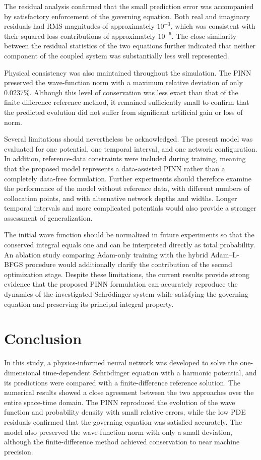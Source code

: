 \documentclass[11pt]{article}
\begin{document}
The residual analysis confirmed that the small prediction error was 
accompanied by satisfactory enforcement of the governing equation. Both real and imaginary residuals 
had RMS magnitudes of approximately \(10^{-3}\), which was consistent with their squared 
loss contributions of approximately \(10^{-6}\). The close similarity between the residual 
statistics of the two equations further indicated that neither component of the coupled 
system was substantially less well represented.

Physical consistency was also maintained throughout the simulation. The PINN preserved the 
wave-function norm with a maximum relative deviation of only \(0.0237\%\). Although this 
level of conservation was less exact than that of the finite-difference reference method, 
it remained sufficiently small to confirm that the predicted evolution did not suffer from 
significant artificial gain or loss of norm.

Several limitations should nevertheless be acknowledged. The present model was evaluated 
for one potential, one temporal interval, and one network configuration. In addition, reference-data 
constraints were included during training, meaning that the proposed model represents a 
data-assisted PINN rather than a completely data-free formulation. Further experiments should 
therefore examine the performance of the model without reference data, with different numbers of 
collocation points, and with alternative network depths and widths. Longer temporal intervals 
and more complicated potentials would also provide a stronger assessment of generalization.

The initial wave function should be normalized in future experiments so that the conserved 
integral equals one and can be interpreted directly as total probability. An ablation study 
comparing Adam-only training with the hybrid Adam--L-BFGS procedure would additionally clarify 
the contribution of the second optimization stage. Despite these limitations, the current 
results provide strong evidence that the proposed PINN formulation can accurately reproduce 
the dynamics of the investigated Schrödinger system while satisfying the governing equation
and preserving its principal integral property.



\section{Conclusion}

In this study, a physics-informed neural network was developed to solve the one-dimensional 
time-dependent Schrödinger equation with a harmonic potential, and its predictions were 
compared with a finite-difference reference solution. The numerical results showed a close 
agreement between the two approaches over the entire space-time domain. The PINN reproduced 
the evolution of the wave function and probability density with small relative errors, while 
the low PDE residuals confirmed that the governing equation was satisfied accurately. The 
model also preserved the wave-function norm with only a small deviation, although the finite-difference 
method achieved conservation to near machine precision.
\end{document}
